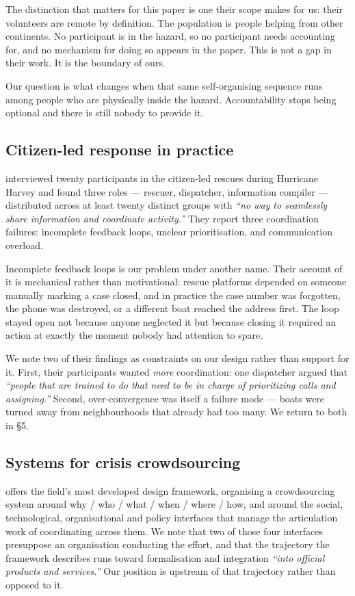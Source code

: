 The distinction that matters for this paper is one their scope makes for
us: their volunteers are remote by definition. The population is people
helping from other continents. No participant is in the hazard, so no
participant needs accounting for, and no mechanism for doing so appears
in the paper. This is not a gap in their work. It is the boundary of
ours.

Our question is what changes when that same self-organising sequence
runs among people who are physically inside the hazard. Accountability
stops being optional and there is still nobody to provide it.

\subsection{Citizen-led response in practice}

\citet{smith2018} interviewed twenty participants in the citizen-led
rescues during Hurricane Harvey and found three roles --- rescuer,
dispatcher, information compiler --- distributed across at least twenty
distinct groups with \emph{``no way to seamlessly share information and
coordinate activity.''} They report three coordination failures:
incomplete feedback loops, unclear prioritisation, and communication
overload.

Incomplete feedback loops is our problem under another name. Their
account of it is mechanical rather than motivational: rescue platforms
depended on someone manually marking a case closed, and in practice the
case number was forgotten, the phone was destroyed, or a different boat
reached the address first. The loop stayed open not because anyone
neglected it but because closing it required an action at exactly the
moment nobody had attention to spare.

We note two of their findings as constraints on our design rather than
support for it. First, their participants wanted \emph{more}
coordination: one dispatcher argued that \emph{``people that are trained
to do that need to be in charge of prioritizing calls and assigning.''}
Second, over-convergence was itself a failure mode --- boats were turned
away from neighbourhoods that already had too many. We return to both in
§5.

\subsection{Systems for crisis crowdsourcing}

\citet{liu2014} offers the field's most developed design framework,
organising a crowdsourcing system around why / who / what / when / where
/ how, and around the social, technological, organisational and policy
interfaces that manage the articulation work of coordinating across
them. We note that two of those four interfaces presuppose an
organisation conducting the effort, and that the trajectory the
framework describes runs toward formalisation and integration
\emph{``into official products and services.''} Our position is upstream
of that trajectory rather than opposed to it.

